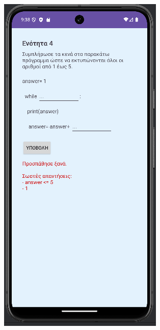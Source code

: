 \documentclass[11pt]{report}
\begin{document}
\begin{figure}[H]
  \centering
  \begin{minipage}[b]{0.45\textwidth}
    \includegraphics[width=\linewidth, height=0.35\textheight, keepaspectratio]{Figures/εικόνα (9).png}

\end{minipage}
\end{figure}
\end{document}
